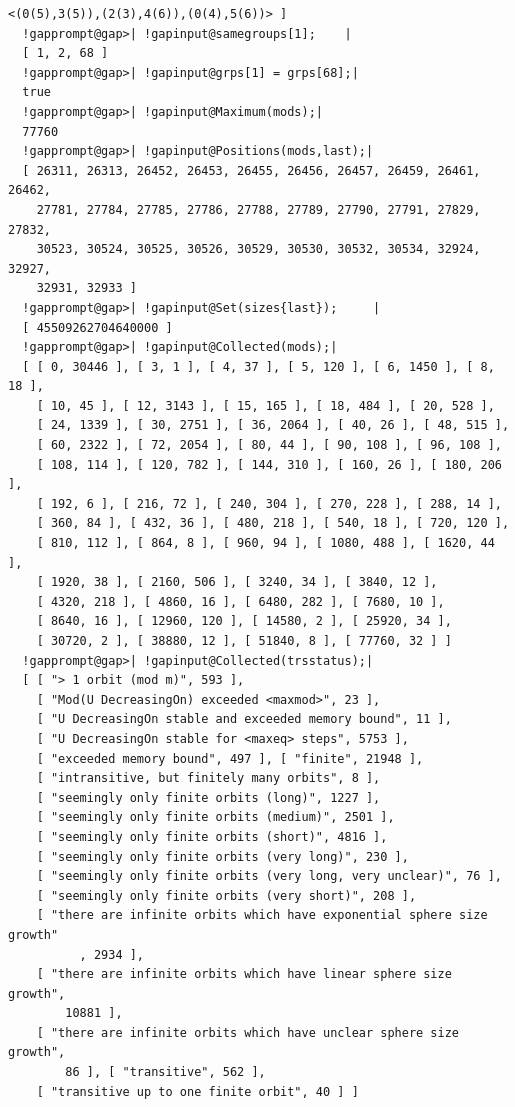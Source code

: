 \documentclass[a4paper,11pt]{report}
\begin{document}
{{{\begin{Verbatim}[commandchars=!@|,fontsize=\small,frame=single,label=Example]
    <(0(5),3(5)),(2(3),4(6)),(0(4),5(6))> ]
  !gapprompt@gap>| !gapinput@samegroups[1];    |
  [ 1, 2, 68 ]
  !gapprompt@gap>| !gapinput@grps[1] = grps[68];|
  true
  !gapprompt@gap>| !gapinput@Maximum(mods);|
  77760
  !gapprompt@gap>| !gapinput@Positions(mods,last);|
  [ 26311, 26313, 26452, 26453, 26455, 26456, 26457, 26459, 26461, 26462, 
    27781, 27784, 27785, 27786, 27788, 27789, 27790, 27791, 27829, 27832, 
    30523, 30524, 30525, 30526, 30529, 30530, 30532, 30534, 32924, 32927, 
    32931, 32933 ]
  !gapprompt@gap>| !gapinput@Set(sizes{last});     |
  [ 45509262704640000 ]
  !gapprompt@gap>| !gapinput@Collected(mods);|
  [ [ 0, 30446 ], [ 3, 1 ], [ 4, 37 ], [ 5, 120 ], [ 6, 1450 ], [ 8, 18 ], 
    [ 10, 45 ], [ 12, 3143 ], [ 15, 165 ], [ 18, 484 ], [ 20, 528 ], 
    [ 24, 1339 ], [ 30, 2751 ], [ 36, 2064 ], [ 40, 26 ], [ 48, 515 ], 
    [ 60, 2322 ], [ 72, 2054 ], [ 80, 44 ], [ 90, 108 ], [ 96, 108 ], 
    [ 108, 114 ], [ 120, 782 ], [ 144, 310 ], [ 160, 26 ], [ 180, 206 ], 
    [ 192, 6 ], [ 216, 72 ], [ 240, 304 ], [ 270, 228 ], [ 288, 14 ], 
    [ 360, 84 ], [ 432, 36 ], [ 480, 218 ], [ 540, 18 ], [ 720, 120 ], 
    [ 810, 112 ], [ 864, 8 ], [ 960, 94 ], [ 1080, 488 ], [ 1620, 44 ], 
    [ 1920, 38 ], [ 2160, 506 ], [ 3240, 34 ], [ 3840, 12 ], 
    [ 4320, 218 ], [ 4860, 16 ], [ 6480, 282 ], [ 7680, 10 ], 
    [ 8640, 16 ], [ 12960, 120 ], [ 14580, 2 ], [ 25920, 34 ], 
    [ 30720, 2 ], [ 38880, 12 ], [ 51840, 8 ], [ 77760, 32 ] ]
  !gapprompt@gap>| !gapinput@Collected(trsstatus);|
  [ [ "> 1 orbit (mod m)", 593 ], 
    [ "Mod(U DecreasingOn) exceeded <maxmod>", 23 ], 
    [ "U DecreasingOn stable and exceeded memory bound", 11 ], 
    [ "U DecreasingOn stable for <maxeq> steps", 5753 ], 
    [ "exceeded memory bound", 497 ], [ "finite", 21948 ], 
    [ "intransitive, but finitely many orbits", 8 ], 
    [ "seemingly only finite orbits (long)", 1227 ], 
    [ "seemingly only finite orbits (medium)", 2501 ], 
    [ "seemingly only finite orbits (short)", 4816 ], 
    [ "seemingly only finite orbits (very long)", 230 ], 
    [ "seemingly only finite orbits (very long, very unclear)", 76 ], 
    [ "seemingly only finite orbits (very short)", 208 ], 
    [ "there are infinite orbits which have exponential sphere size growth"
          , 2934 ], 
    [ "there are infinite orbits which have linear sphere size growth", 
        10881 ],
    [ "there are infinite orbits which have unclear sphere size growth", 
        86 ], [ "transitive", 562 ], 
    [ "transitive up to one finite orbit", 40 ] ]
\end{Verbatim}
 }

}}
\end{document}
